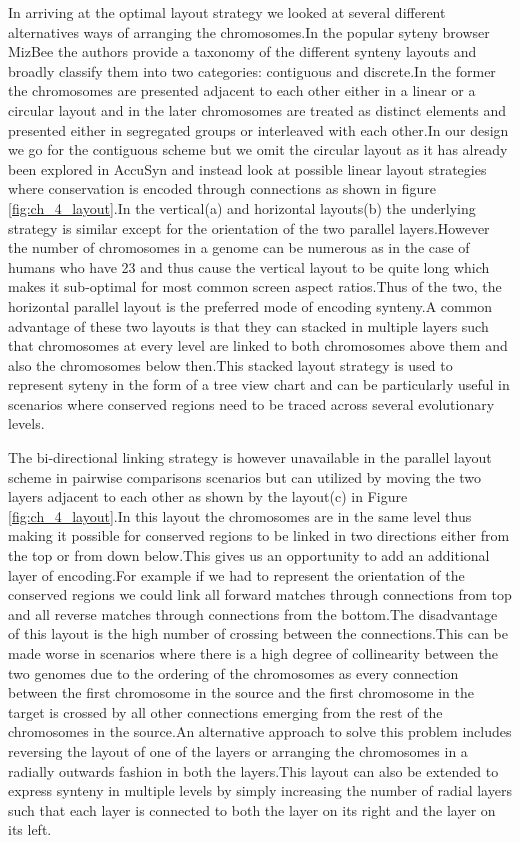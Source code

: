 In arriving at the optimal layout strategy we looked at several different alternatives ways of arranging the chromosomes.In the popular syteny browser MizBee\cite{Meyer2009} the authors provide a taxonomy of the different synteny layouts and broadly classify them into two categories: contiguous and discrete.In the former the chromosomes are presented adjacent to each other either in a linear or a circular layout and in the later chromosomes are treated as distinct elements and presented either in segregated groups or interleaved with each other.In our design we go for the contiguous scheme but we omit the circular layout as it has already been explored in AccuSyn\cite{accusyn}  and instead look at possible linear layout strategies where conservation is encoded through connections as shown in figure \ref{fig:ch_4_layout}.In the vertical(a) and horizontal layouts(b) the underlying strategy is similar except for the orientation of the two parallel layers.However the number of chromosomes in a genome can be numerous as in the case of humans who have 23 and thus cause the vertical layout to be quite long which makes it sub-optimal for most common screen aspect ratios.Thus of the two, the horizontal parallel layout is the preferred mode of encoding synteny.A common advantage of these two layouts is that they can stacked in multiple layers such that chromosomes at every level are linked to both chromosomes above them and also the chromosomes below then.This stacked layout strategy is used to represent syteny in the form of a tree view chart and can be particularly useful in scenarios where conserved regions need to be traced across several evolutionary levels.

The bi-directional linking strategy is however unavailable in the parallel layout scheme in pairwise comparisons scenarios but can utilized by moving the two layers adjacent to each other as shown by the layout(c) in Figure \ref{fig:ch_4_layout}.In this layout the chromosomes are in the same level thus making it possible for conserved regions to be linked in two directions either from the top or from down below.This gives us an opportunity to add an additional layer of encoding.For example if we had to represent the orientation of the conserved regions we could link all forward matches through connections from top and all reverse matches through connections from the bottom.The disadvantage of this layout is the high number of crossing between the connections.This can be made worse in scenarios where there is a high degree of collinearity between the two genomes due to the ordering of the chromosomes as every connection between the first chromosome in the source and the first chromosome in the target is crossed by all other connections emerging from the rest of the chromosomes in the source.An alternative approach to solve this problem includes reversing the layout of one of the layers or arranging the chromosomes in a radially outwards fashion in  both the layers.This layout can also be extended to express synteny in multiple levels by simply increasing the number of radial layers such that each layer is connected to both the layer on its right and the layer on its left.

